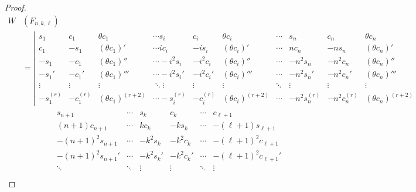 \documentclass[11pt]{amsart}
\theoremstyle{remark}
\theoremstyle{definition}
\begin{document}
\begin{proof}
\begin{align*}
W&(F_{n,k,\ell}) \\
&=
  \left|
  \begin{array}{ccccccccccc}
   s_1         &c_1            &\theta c_1            &\cdots     s_i         &c_i            &\theta c_i            &\cdots       & s_n         &c_n               &\theta c_n   \\
  c_1         &-s_1           &(\theta c_1)'         &\cdots      ic_i         &-is_i           &(\theta c_i)'         &\cdots   & nc_n         &-ns_n             &(\theta c_n)' \\
  -s_1        &-c_1           &(\theta c_1)''        &\cdots      -i^2s_i      &-i^2c_i           &(\theta c_i)''        &\cdots  & -n^2s_n        &-n^2c_n           &(\theta c_n)''  \\
  -s_1'       &-c_1'          &(\theta c_1)'''       &\cdots      -i^2s_i'     &-i^2c_i'          &(\theta c_i)'''       &\cdots  & -n^2s_n'       &-n^2c_n'          &(\theta c_n)'''  \\
  \vdots    &\vdots           &\vdots                &\ddots      \vdots    &\vdots           &\vdots                &\ddots  &\vdots           &\vdots            &\vdots         \\
 -s_1^{(r)}   & -c_1^{(r)}    &(\theta c_1)^{(r+2)}  &\cdots      -s_i^{(r)}   & -c_i^{(r)}    &(\theta c_i)^{(r+2)}  &\cdots   &-n^2s_n^{(r)}    & -n^2c_n^{(r)}    &(\theta c_n)^{(r+2)}
  \end{array}
  \right. \\
 & \quad
  \left.
  \begin{array}{ccccccc}
\quad \quad  & s_{n+1}             &\cdots               & s_{k}              & c_{k}                &\cdots               & c_{\ell+1}   \\
\quad \quad  &  (n+1)c_{n+1}         &\cdots              & kc_{k}         & -ks_{k}          &\cdots               & -(\ell+1)s_{\ell+1}  \\
\quad \quad  &  -(n+1)^2 s_{n+1}       &\cdots            &-k^2 s_{k}      & -k^2c_{k}         &\cdots              & -(\ell+1)^2c_{\ell+1} \\
 \quad \quad  &  -(n+1)^2 s_{n+1}'      &\cdots          & -k^2 s_{k}'    & -k^2c_{k}'        &\cdots              & -(\ell+1)^2c_{\ell+1}'   \\
 \quad \quad  &   \ddots                 &\ddots           &\vdots                  &\vdots               &\ddots                &\vdots  \\

\end{array}
\end{align*}
\end{proof}
\end{document}
